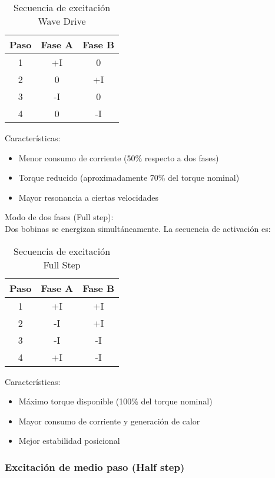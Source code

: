 \begin{table}[ht]
\centering
\begin{tabular}{|c|c|c|}
\hline
\textbf{Paso} & \textbf{Fase A} & \textbf{Fase B} \\
\hline
1 & +I & 0 \\
2 & 0 & +I \\
3 & -I & 0 \\
4 & 0 & -I \\
\hline
\end{tabular}
\caption{Secuencia de excitación Wave Drive}
\end{table}

Características:
\begin{itemize}[label=$\bullet$]
    \item Menor consumo de corriente (50\% respecto a dos fases)
    \item Torque reducido (aproximadamente 70\% del torque nominal)
    \item Mayor resonancia a ciertas velocidades\\
\end{itemize}

Modo de dos fases (Full step):\\

Dos bobinas se energizan simultáneamente. La secuencia de activación es:

\begin{table}[ht]
\centering
\begin{tabular}{|c|c|c|}
\hline
\textbf{Paso} & \textbf{Fase A} & \textbf{Fase B} \\
\hline
1 & +I & +I \\
2 & -I & +I \\
3 & -I & -I \\
4 & +I & -I \\
\hline
\end{tabular}
\caption{Secuencia de excitación Full Step}
\end{table}

Características:
\begin{itemize}[label=$\bullet$]
    \item Máximo torque disponible (100\% del torque nominal)
    \item Mayor consumo de corriente y generación de calor
    \item Mejor estabilidad posicional
\end{itemize}

\subsubsection{Excitación de medio paso (Half step)}

